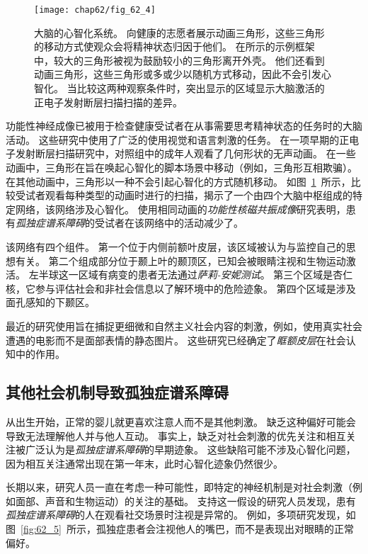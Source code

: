 \begin{figure}[htbp]
	\centering
	\texttt{[image: chap62/fig\_62\_4]}
	\caption{大脑的心智化系统。
		向健康的志愿者展示动画三角形，这些三角形的移动方式使观众会将精神状态归因于他们。
		在所示的示例框架中，较大的三角形被视为鼓励较小的三角形离开外壳。
		他们还看到动画三角形，这些三角形或多或少以随机方式移动，因此不会引发心智化。
		当比较这两种观察条件时，突出显示的区域显示大脑激活的正电子发射断层扫描扫描的差异\cite{castelli2002autism}。}
	\label{fig:62_4}
\end{figure}


功能性神经成像已被用于检查健康受试者在从事需要思考精神状态的任务时的大脑活动。
这些研究中使用了广泛的使用视觉和语言刺激的任务。
在一项早期的正电子发射断层扫描研究中，对照组中的成年人观看了几何形状的无声动画。
在一些动画中，三角形在旨在唤起心智化的脚本场景中移动（例如，三角形互相欺骗）。
在其他动画中，三角形以一种不会引起心智化的方式随机移动。
如图~\ref{fig:62_4}~所示，比较受试者观看每种类型的动画时进行的扫描，揭示了一个由四个大脑中枢组成的特定网络，该网络涉及心智化。
使用相同动画的\textit{功能性核磁共振成像}研究表明，患有\textit{孤独症谱系障碍}的受试者在该网络中的活动减少了。


该网络有四个组件。
第一个位于内侧前额叶皮层，该区域被认为与监控自己的思想有关。
第二个组成部分位于颞上叶的颞顶区，已知会被眼睛注视和生物运动激活。
左半球这一区域有病变的患者无法通过\textit{萨莉-安妮测试}。
第三个区域是杏仁核，它参与评估社会和非社会信息以了解环境中的危险迹象。
第四个区域是涉及面孔感知的下颞区。


最近的研究使用旨在捕捉更细微和自然主义社会内容的刺激，例如，使用真实社会遭遇的电影而不是面部表情的静态图片。
这些研究已经确定了\textit{眶额皮层}在社会认知中的作用。



\subsection{其他社会机制导致孤独症谱系障碍}

从出生开始，正常的婴儿就更喜欢注意人而不是其他刺激。
缺乏这种偏好可能会导致无法理解他人并与他人互动。
事实上，缺乏对社会刺激的优先关注和相互关注被广泛认为是\textit{孤独症谱系障碍}的早期迹象。
这些缺陷可能不涉及心智化问题，因为相互关注通常出现在第一年末，此时心智化迹象仍然很少。


长期以来，研究人员一直在考虑一种可能性，即特定的神经机制是对社会刺激（例如面部、声音和生物运动）的关注的基础。
支持这一假设的研究人员发现，患有\textit{孤独症谱系障碍}的人在观看社交场景时注视是异常的。
例如，多项研究发现，如图~\ref{fig:62_5}~所示，孤独症患者会注视他人的嘴巴，而不是表现出对眼睛的正常偏好。


